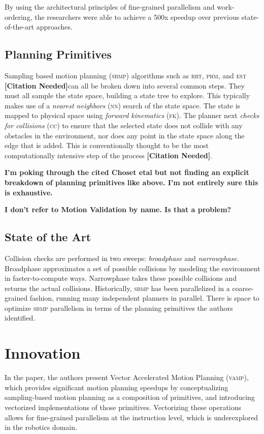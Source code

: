 \documentclass{article}
\newcommand{\todo}[1]{\textbf{\color{red}#1}}
\newcommand{\citationneeded}{\textbf{\color{blue}[Citation Needed]}}
\begin{document}
By using the architectural principles of fine-grained parallelism and work-ordering, the researchers were able to achieve a 500x speedup over previous state-of-the-art approaches.

\subsection{Planning Primitives}

Sampling based motion planning (\textsc{sbmp}) algorithms such as \textsc{rrt}, \textsc{prm}, and \textsc{est} \citationneeded can all be broken down into several common steps. They must all sample the state space, building a state tree to explore. This typically makes use of a \textit{nearest neighbors} (\textsc{nn}) search of the state space. The state is mapped to physical space using \textit{forward kinematics} (\textsc{fk}). The planner next \textit{checks for collisions} (\textsc{cc}) to ensure that the selected state does not collide with any obstacles in the environment, nor does any point in the state space along the edge that is added. This is conventionally thought to be the most computationally intensive step of the process \citationneeded. 

\todo{I'm poking through the cited Choset etal but not finding an explicit breakdown of planning primitives like above. I'm not entirely sure this is exhaustive.}

\todo{I don't refer to Motion Validation by name. Is that a problem?}

\subsection{State of the Art}

Collision checks are performed in two sweeps: \textit{broadphase} and \textit{narrowphase}. Broadphase approximates a set of possible collisions by modeling the environment in faster-to-compute ways. Narrowphase takes these possible collisions and returns the actual collisions.
Historically, \textsc{sbmp} has been parallelized in a coarse-grained fashion, running many independent planners in parallel. There is space to optimize \textsc{sbmp} parallelism in terms of the planning primitives the authors identified. 

\section{Innovation}

In the paper, the authors present Vector Accelerated Motion Planning (\textsc{vamp}), which provides significant motion planning speedups by conceptualizing sampling-based motion planning as a composition of primitives, and introducing vectorized implementations of those primitives. Vectorizing these operations allows for fine-grained parallelism at the instruction level, which is underexplored in the robotics domain.
\end{document}
